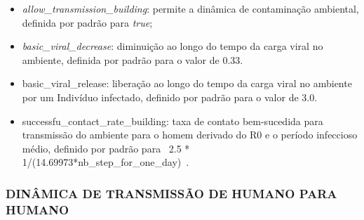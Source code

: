 \begin{itemize}
\item \textit{allow\_transmission\_building}: permite a dinâmica de contaminação ambiental, definida por padrão para \textit{true};
\item \textit{basic\_viral\_decrease}: diminuição ao longo do tempo da carga viral no ambiente, definida por padrão para o valor de 0.33.
\item {basic\_viral\_release}: liberação ao longo do tempo da carga viral no ambiente por um Indivíduo infectado, definido por padrão para o valor de 3.0.
\item {successfu\_contact\_rate\_building}: taxa de contato bem-sucedida para transmissão do ambiente para o homem derivado do R0 e o período infeccioso médio, definido por padrão para \ 2.5 * 1/(14.69973*{nb\_step\_for\_one\_day})\ .
\end{itemize}

\subsubsection{DINÂMICA DE TRANSMISSÃO DE HUMANO PARA HUMANO}

